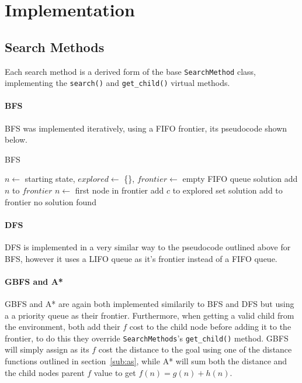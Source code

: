 \section{Implementation} %
\label{sec:implementation}

\subsection{Search Methods} %
\label{sub:search_methods}
Each search method is a derived form of the base \texttt{SearchMethod} class, implementing the \texttt{search()} and \texttt{get_child()} virtual methods.

\paragraph{BFS} %
\label{par:bfs}
BFS was implemented iteratively, using a FIFO frontier, its pseudocode shown below.

\begin{breakablealgorithm}
	\caption{BFS}
	\begin{algorithmic}[1]
			\State $n \gets$ starting state, $explored \gets$ \{\}, $frontier \gets$ empty FIFO queue
			 \Return solution \EndIf
			\State add $n$ to $frontier$
				\State $n \gets$ first node in frontier
						\State add $c$ to explored set
						 \Return solution \EndIf
						\State add to frontier
					\EndIf
				\EndFor
			\EndWhile
			\State \Return no solution found
		\EndProcedure
	\end{algorithmic}
\end{breakablealgorithm}

\paragraph{DFS} %
\label{par:dfs}
DFS is implemented in a very similar way to the pseudocode outlined above for BFS, however it uses a LIFO queue as it's frontier instead of a FIFO queue.

\paragraph{GBFS and A*} %
\label{par:gbfs_and_a_}
GBFS and A* are again both implemented similarily to BFS and DFS but using a a priority queue as their frontier. Furthermore, when getting a valid child from the environment, both add their $f$ cost to the child node before adding it to the frontier, to do this they override \texttt{SearchMethods}'s \texttt{get_child()} method. GBFS will simply assign as its $f$ cost the distance to the goal using one of the distance functions outlined in section~\ref{sub:as}, while A* will sum both the distance and the child nodes parent $f$ value to get $f(n)=g(n) + h(n)$.

